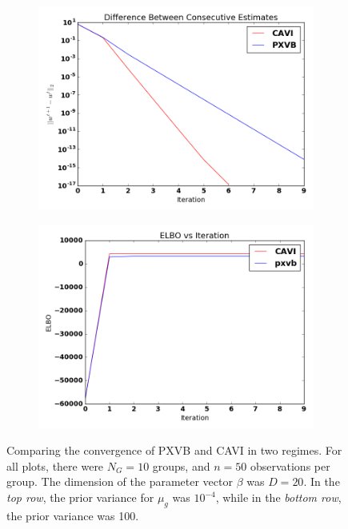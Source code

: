 \documentclass{article}
\begin{document}
\begin{figure}[tb]
\begin{subfigure}[t]{0.49\textwidth}
        \subcaption{}
    \end{subfigure}
    \begin{subfigure}[t]{0.49\textwidth}
        \includegraphics[width=\textwidth]{LMM/pw_lmm_smallvar.png}
        \subcaption{}
    \end{subfigure}
          \begin{subfigure}[t]{0.49\textwidth}
        \includegraphics[width=\textwidth]{LMM/elbo_lmm_smallvar.png}
            \subcaption{}
    \end{subfigure}
    \caption{Comparing the convergence of PXVB and CAVI in two regimes. For all plots, there were $N_G = 10$ groups, and $n = 50$ observations per group. The dimension of the parameter vector $\beta$ was $D = 20$. In the {\itshape top row}, the prior variance for $\mu_g$ was $10^{-4}$, while in the {\itshape bottom row}, the prior variance was 100. } %
    \label{fig:LMM}
\end{figure}
\end{document}
